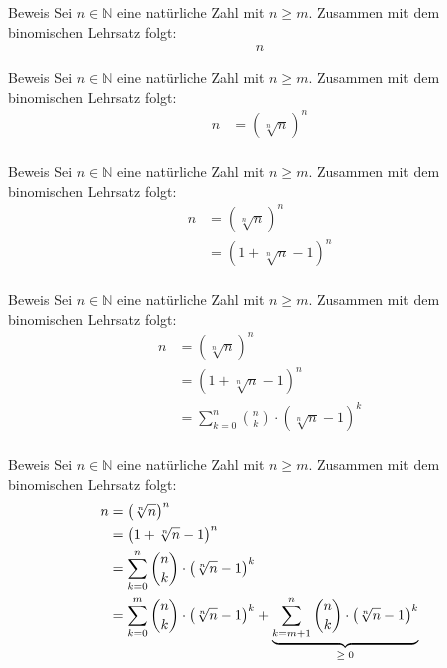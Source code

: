\documentclass[10pt]{beamer}
\def\bN{\mathbb{N}}
\begin{document}
\begin{frame}{Beweis}
    Sei \( n \in \bN \) eine natürliche Zahl mit \( n \geq m \). Zusammen mit dem binomischen Lehrsatz folgt:
    \begin{align*}
        n
    \end{align*}
\end{frame}



\begin{frame}{Beweis}
    Sei \( n \in \bN \) eine natürliche Zahl mit \( n \geq m \). Zusammen mit dem binomischen Lehrsatz folgt:
    \begin{align*}
        n
        & = \left( \sqrt[n]{n} \right)^{n} \\
    \end{align*}
\end{frame}



\begin{frame}{Beweis}
    Sei \( n \in \bN \) eine natürliche Zahl mit \( n \geq m \). Zusammen mit dem binomischen Lehrsatz folgt:
    \begin{align*}
        n
        & = \left( \sqrt[n]{n} \right)^{n} \\
        & = \left( 1 + \sqrt[n]{n} - 1 \right)^{n} \\
    \end{align*}
\end{frame}



\begin{frame}{Beweis}
    Sei \( n \in \bN \) eine natürliche Zahl mit \( n \geq m \). Zusammen mit dem binomischen Lehrsatz folgt:
    \begin{align*}
        n
        & = \left( \sqrt[n]{n} \right)^{n} \\
        & = \left( 1 + \sqrt[n]{n} - 1 \right)^{n} \\
        & = \sum_{k = 0}^{n}\binom{n}{k} \cdot \left( \sqrt[n]{n} - 1 \right)^{k} \\
    \end{align*}
\end{frame}



\begin{frame}{Beweis}
    Sei \( n \in \bN \) eine natürliche Zahl mit \( n \geq m \). Zusammen mit dem binomischen Lehrsatz folgt:
    \begin{align*}
        n
        & = \left( \sqrt[n]{n} \right)^{n} \\
        & = \left( 1 + \sqrt[n]{n} - 1 \right)^{n} \\
        & = \sum_{k = 0}^{n} \binom{n}{k} \cdot \left( \sqrt[n]{n} - 1 \right)^{k} \\
        & = \sum_{k = 0}^{m} \binom{n}{k} \cdot \left( \sqrt[n]{n} - 1 \right)^{k} + \underbrace{\sum_{k = m + 1}^{n} \binom{n}{k} \cdot \left( \sqrt[n]{n} - 1 \right)^{k}}_{\text{\( \geq 0 \)}} \\
    \end{align*}
\end{frame}
\end{document}
